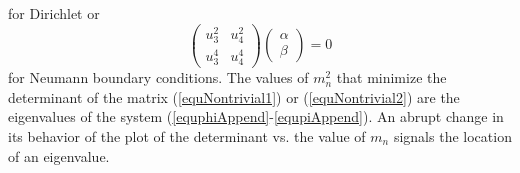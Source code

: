 for Dirichlet or
\begin{equation}\label{equNontrivial2}
\left(\begin{array}{cc} u_3^2 & u_4^2 \\ u_3^{4} & u_4^{4} \end{array}\right)\left(\begin{array}{c} \alpha \\ \beta\end{array}\right) = 0
\end{equation}
for Neumann boundary conditions. 
The values of $m_n^2$ that minimize the determinant of the matrix (\ref{equNontrivial1}) or (\ref{equNontrivial2}) are the eigenvalues of the system (\ref{equphiAppend}-\ref{equpiAppend}). 
An abrupt change in its behavior of the plot of the determinant vs. the value of $m_n$ signals the location of an eigenvalue. 